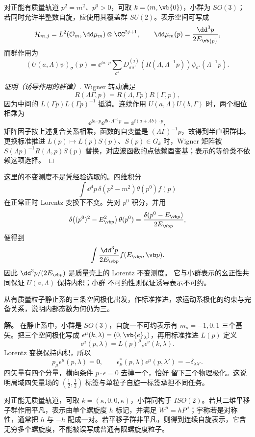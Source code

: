 对正能有质量轨道 $p^2=m^2$、$p^0>0$，可取 $k=(m,\vb{0})$，小群为 $SO(3)$；若同时允许半整数自旋，应使用其覆盖群 $SU(2)$。表示空间可写成
\[
\mathcal H_{m,j}=L^2(\mathcal O_m,\dd\mu_m)\otimes\CC^{2j+1},
\qquad
\dd\mu_m(p)=\frac{\dd^3p}{2E_{\vb{p}}},
\]
而群作用为
\[
(U(a,\Lambda)\psi)_\sigma(p)
=\ee^{\ii a\cdot p}
\sum_{\sigma'}D^{(j)}_{\sigma\sigma'}\!\left(R(\Lambda,\Lambda^{-1}p)\right)
\psi_{\sigma'}(\Lambda^{-1}p).
\]
\begin{proof}[证明（诱导作用的群律）]
Wigner 转动满足
\[
 R(\Lambda\Gamma,p)=R(\Lambda,\Gamma p)R(\Gamma,p),
\]
因为中间的 $L(\Gamma p)L(\Gamma p)^{-1}$ 抵消。连续作用
$U(a,\Lambda)U(b,\Gamma)$ 时，两个相位相乘为
\[
 \ee^{\ii a\cdot p}\ee^{\ii b\cdot\Lambda^{-1}p}
 =\ee^{\ii(a+\Lambda b)\cdot p},
\]
矩阵因子按上述复合关系相乘，函数的自变量是 $(\Lambda\Gamma)^{-1}p$，故得到半直积群律。更换标准推进 $L(p)\mapsto L(p)S(p)$、$S(p)\in G_k$ 时，Wigner 矩阵被
$S(\Lambda p)^{-1}R(\Lambda,p)S(p)$ 替换，对应波函数的点依赖酉变基；表示的等价类不依赖这项选择。
\end{proof}

这里的不变测度不是凭经验选取的。四维积分
\[
\int \dd^4p\,
\delta(p^2-m^2)\theta(p^0)f(p)
\]
在正常正时 Lorentz 变换下不变。先对 $p^0$ 积分，并用
\[
\delta\!\left((p^0)^2-E_{\vb p}^2\right)\theta(p^0)
=\frac{\delta(p^0-E_{\vb p})}{2E_{\vb p}},
\]
便得到
\[
\int\frac{\dd^3p}{2E_{\vb p}}f(E_{\vb p},\vb p).
\]
因此 $\dd^3p/(2E_{\vb p})$ 是质量壳上的 Lorentz 不变测度。
它与小群表示的幺正性共同保证 $U(a,\Lambda)$ 保持内积；小群
不可约性则保证诱导表示不可约。

\begin{example}[有质量自旋一表示为何只有三个内部态]
从有质量粒子静止系的三条空间极化出发，作标准推进，求运动系极化的约束与完备关系，说明内部态数为何仍为三。

\textbf{解。} 在静止系中，小群是 $SO(3)$，自旋一不可约表示有
$m_s=-1,0,1$ 三个基矢。把三个空间极化写成
$\epsilon^\mu(k,\lambda)=(0,\vb{e}_\lambda)$，再用标准推进
$L(p)$ 定义
\[
\epsilon^\mu(p,\lambda)=L(p)^\mu{}_\nu\epsilon^\nu(k,\lambda).
\]
Lorentz 变换保持内积，所以
\[
p_\mu\epsilon^\mu(p,\lambda)=0,\qquad
\epsilon_\mu^*(p,\lambda)\epsilon^\mu(p,\lambda')=-\delta_{\lambda\lambda'}.
\]
四矢量有四个分量，横向条件 $p\cdot\epsilon=0$ 去掉一个，恰好
留下三个物理极化。这说明局域四矢量场的 $(\tfrac12,\tfrac12)$
标签与单粒子自旋一标签承担不同任务。
\end{example}

对正能无质量轨道，可取 $k=(\kappa,0,0,\kappa)$，小群同构于 $ISO(2)$。若其二维平移子群作用平凡，表示由单个螺旋度 $h$ 标记，并满足 $W^\mu=hP^\mu$；宇称若是对称性，通常把 $h$ 与 $-h$ 配成一对。若平移子群非平凡，则得到连续自旋表示，它含无穷多个螺旋度，不能被误写成普通有限螺旋度粒子。

